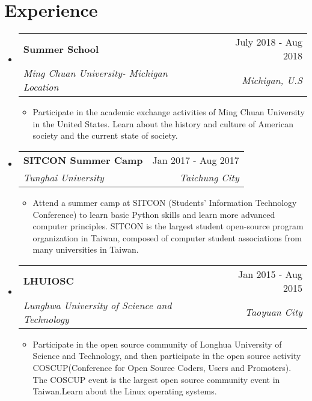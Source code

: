 \documentclass[letterpaper,11pt]{article}
\makeatletter
\newcommand{\resumeItem}[1]{
  \item\small{
    {#1 \vspace{-2pt}}
  }
}
\newcommand{\resumeSubheading}[4]{
  \vspace{-2pt}\item
    \begin{tabular*}{0.97\textwidth}[t]{l@{\extracolsep{\fill}}r}
      \textbf{#1} & #2 \\
      \textit{\small#3} & \textit{\small #4} \\
    \end{tabular*}\vspace{-7pt}
}
\newcommand{\resumeSubSubheading}[2]{
    \item
    \begin{tabular*}{0.97\textwidth}{l@{\extracolsep{\fill}}r}
      \textit{\small#1} & \textit{\small #2} \\
    \end{tabular*}\vspace{-7pt}
}
\newcommand{\resumeSubHeadingListStart}{\begin{itemize}[leftmargin=0.15in, label={}]}
\newcommand{\resumeSubHeadingListEnd}{\end{itemize}}
\newcommand{\resumeItemListStart}{\begin{itemize}}
\newcommand{\resumeItemListEnd}{\end{itemize}\vspace{-5pt}}
\makeatother
\begin{document}
\section{Experience}
  \resumeSubHeadingListStart
    \resumeSubheading
      {Summer School}{July 2018 - Aug 2018}
      {Ming Chuan University- Michigan Location}{Michigan, U.S}
      \resumeItemListStart
        \resumeItem{Participate in the academic exchange activities of Ming Chuan University in the United States. Learn about the history and culture of American society and the current state of society.}
      \resumeItemListEnd
    \resumeSubheading
      {SITCON Summer Camp }{Jan 2017 - Aug 2017}
      {Tunghai University}{Taichung City}
      \resumeItemListStart
        \resumeItem{Attend a summer camp at SITCON (Students' Information Technology Conference) to learn basic Python skills and learn more advanced computer principles. SITCON is the largest student open-source program organization in Taiwan, composed of computer student associations from many universities in Taiwan.}
      \resumeItemListEnd
    \resumeSubheading
      {LHUIOSC}
      {Jan 2015 - Aug 2015}{Lunghwa University of Science and Technology}{Taoyuan City}
      \resumeItemListStart
        \resumeItem{Participate in the open source community of Longhua University of Science and Technology, and then participate in the open source activity COSCUP(Conference for Open Source Coders, Users and Promoters). The COSCUP event is the largest open source community event in Taiwan.Learn about the Linux operating systems.}
    \resumeItemListEnd





  \resumeSubHeadingListEnd


\end{document}
